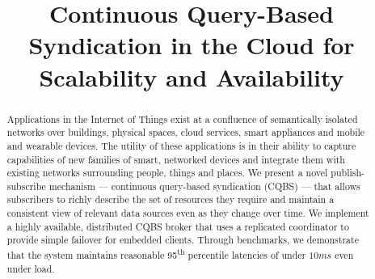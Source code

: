 \documentclass[conference]{IEEEtran}
\begin{document}
\title{Continuous Query-Based Syndication in the Cloud for Scalability and Availability}

\author{
\and
{}
}

\maketitle

\begin{abstract}
Applications in the Internet of Things exist at a confluence of semantically isolated networks over buildings, physical spaces, cloud services, smart appliances and mobile and wearable devices.
The utility of these applications is in their ability to capture capabilities of new families of smart, networked devices and integrate them with existing networks surrounding people, things and places.
We present a novel publish-subscribe mechanism --- continuous query-based syndication (CQBS) --- that allows subscribers to richly describe the set of resources they require and maintain a consistent view of relevant data sources even as they change over time.
We implement a highly available, distributed CQBS broker that uses a replicated coordinator to provide simple failover for embedded clients.
Through benchmarks, we demonstrate that the system maintains reasonable 95\textsuperscript{th} percentile latencies of under $10ms$ even under load.
\end{abstract}















\end{document}
